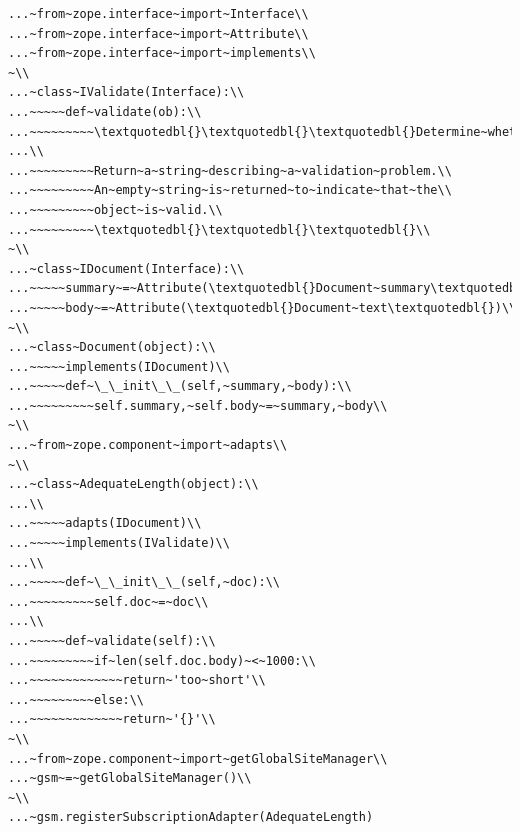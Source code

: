 \documentclass[a4paper,openany,twoside,draft]{book}
\begin{document}
\begin{verbatim}
...~from~zope.interface~import~Interface\\
...~from~zope.interface~import~Attribute\\
...~from~zope.interface~import~implements\\
~\\
...~class~IValidate(Interface):\\
...~~~~~def~validate(ob):\\
...~~~~~~~~~\textquotedbl{}\textquotedbl{}\textquotedbl{}Determine~whether~the~object~is~valid\\
...\\
...~~~~~~~~~Return~a~string~describing~a~validation~problem.\\
...~~~~~~~~~An~empty~string~is~returned~to~indicate~that~the\\
...~~~~~~~~~object~is~valid.\\
...~~~~~~~~~\textquotedbl{}\textquotedbl{}\textquotedbl{}\\
~\\
...~class~IDocument(Interface):\\
...~~~~~summary~=~Attribute(\textquotedbl{}Document~summary\textquotedbl{})\\
...~~~~~body~=~Attribute(\textquotedbl{}Document~text\textquotedbl{})\\
~\\
...~class~Document(object):\\
...~~~~~implements(IDocument)\\
...~~~~~def~\_\_init\_\_(self,~summary,~body):\\
...~~~~~~~~~self.summary,~self.body~=~summary,~body\\
~\\
...~from~zope.component~import~adapts\\
~\\
...~class~AdequateLength(object):\\
...\\
...~~~~~adapts(IDocument)\\
...~~~~~implements(IValidate)\\
...\\
...~~~~~def~\_\_init\_\_(self,~doc):\\
...~~~~~~~~~self.doc~=~doc\\
...\\
...~~~~~def~validate(self):\\
...~~~~~~~~~if~len(self.doc.body)~<~1000:\\
...~~~~~~~~~~~~~return~'too~short'\\
...~~~~~~~~~else:\\
...~~~~~~~~~~~~~return~'{}'\\
~\\
...~from~zope.component~import~getGlobalSiteManager\\
...~gsm~=~getGlobalSiteManager()\\
~\\
...~gsm.registerSubscriptionAdapter(AdequateLength)
\end{verbatim}
\end{document}
